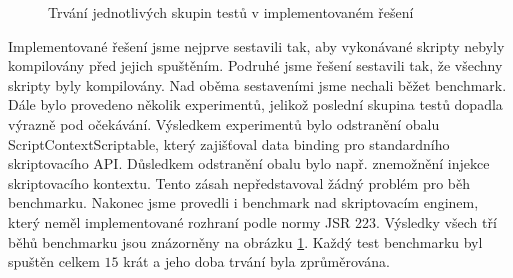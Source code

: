 \begin{figure}[H]
  \begin{center}
    \caption{Trvání jednotlivých skupin testů v implementovaném řešení}
    \label{Figure.ScriptBoxComparison}
  \end{center}
\end{figure}

\vspace{-1em}

Implementované řešení jsme nejprve sestavili tak, aby vykonávané skripty nebyly kompilovány před jejich spuštěním. Podruhé jsme řešení sestavili tak, že všechny skripty byly kompilovány. Nad oběma sestaveními jsme nechali běžet benchmark. Dále bylo provedeno několik experimentů, jelikož poslední skupina testů dopadla výrazně pod očekávání. Výsledkem experimentů bylo odstranění obalu ScriptContextScriptable, který zajišťoval data binding pro standardního skriptovacího API. Důsledkem odstranění obalu bylo např. znemožnění injekce skriptovacího kontextu. Tento zásah nepředstavoval žádný problém pro běh benchmarku. Nakonec jsme provedli i benchmark nad skriptovacím enginem, který neměl implementované rozhraní podle normy JSR 223. Výsledky všech tří běhů benchmarku jsou znázorněny na obrázku \ref{Figure.ScriptBoxComparison}. Každý test benchmarku byl spuštěn celkem $15$ krát a jeho doba trvání byla zprůměrována.


